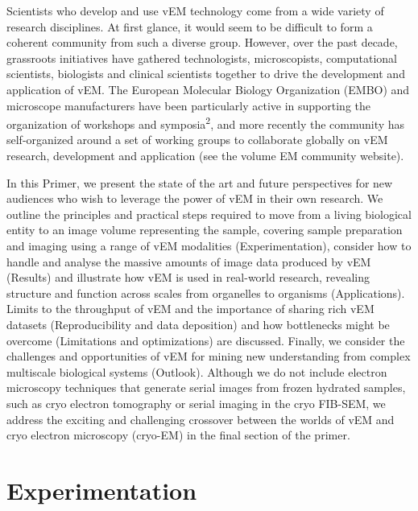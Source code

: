 \documentclass{article}
\begin{document}
Scientists who develop and use vEM technology come from a wide variety of research disciplines. At first glance, it would seem to be difficult to form a coherent community from such a diverse group. However, over the past decade, grassroots initiatives have gathered technologists, microscopists, computational scientists, biologists and clinical scientists together to drive the development and application of vEM. The European Molecular Biology Organization (EMBO) and microscope manufacturers have been particularly active in supporting the organization of workshops and symposia\textsuperscript{2}, and more recently the community has self-organized around a set of working groups to collaborate globally on vEM research, development and application (see the volume EM community website).

In this Primer, we present the state of the art and future perspectives for new audiences who wish to leverage the power of vEM in their own research. We outline the principles and practical steps required to move from a living biological entity to an image volume representing the sample, covering sample preparation and imaging using a range of vEM modalities (Experimentation), consider how to handle and analyse the massive amounts of image data produced by vEM (Results) and illustrate how vEM is used in real-world research, revealing structure and function across scales from organelles to organisms (Applications). Limits to the throughput of vEM and the importance of sharing rich vEM datasets (Reproducibility and data deposition) and how bottlenecks might be overcome (Limitations and optimizations) are discussed. Finally, we consider the challenges and opportunities of vEM for mining new understanding from complex multiscale biological systems (Outlook). Although we do not include electron microscopy techniques that generate serial images from frozen hydrated samples, such as cryo electron tomography or serial imaging in the cryo FIB-SEM, we address the exciting and challenging crossover between the worlds of vEM and cryo electron microscopy (cryo-EM) in the final section of the primer.

\section*{Experimentation}
\end{document}
